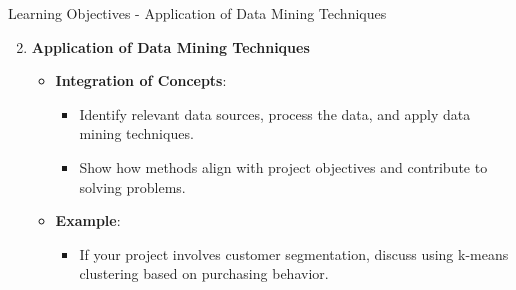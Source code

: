 \documentclass[aspectratio=169]{beamer}
\begin{document}
\begin{frame}[fragile]{Learning Objectives - Application of Data Mining Techniques}
    \begin{enumerate}
        \setcounter{enumi}{1} %
        \item \textbf{Application of Data Mining Techniques}
            \begin{itemize}
                \item \textbf{Integration of Concepts}:
                    \begin{itemize}
                        \item Identify relevant data sources, process the data, and apply data mining techniques.
                        \item Show how methods align with project objectives and contribute to solving problems.
                    \end{itemize}
                \item \textbf{Example}:
                    \begin{itemize}
                        \item If your project involves customer segmentation, discuss using k-means clustering based on purchasing behavior.
                    \end{itemize}
            \end{itemize}
    \end{enumerate}
\end{frame}
\end{document}
